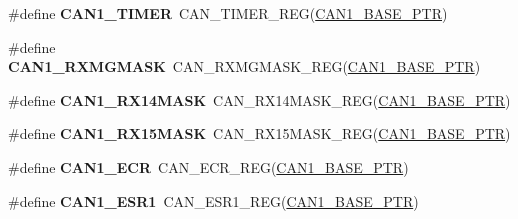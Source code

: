 \begin{DoxyCompactItemize}
\item 
\hypertarget{group___c_a_n___register___accessor___macros_gac056e0ad934790e294031f24008d0155}{}\#define {\bfseries C\+A\+N1\+\_\+\+T\+I\+M\+E\+R}~C\+A\+N\+\_\+\+T\+I\+M\+E\+R\+\_\+\+R\+E\+G(\hyperlink{group___c_a_n___peripheral_ga810387eeeb9ccd0e09ae057ff6f0d2ca}{C\+A\+N1\+\_\+\+B\+A\+S\+E\+\_\+\+P\+T\+R})\label{group___c_a_n___register___accessor___macros_gac056e0ad934790e294031f24008d0155}

\item 
\hypertarget{group___c_a_n___register___accessor___macros_ga6865459aa48a146b53bcef7a31e9b5eb}{}\#define {\bfseries C\+A\+N1\+\_\+\+R\+X\+M\+G\+M\+A\+S\+K}~C\+A\+N\+\_\+\+R\+X\+M\+G\+M\+A\+S\+K\+\_\+\+R\+E\+G(\hyperlink{group___c_a_n___peripheral_ga810387eeeb9ccd0e09ae057ff6f0d2ca}{C\+A\+N1\+\_\+\+B\+A\+S\+E\+\_\+\+P\+T\+R})\label{group___c_a_n___register___accessor___macros_ga6865459aa48a146b53bcef7a31e9b5eb}

\item 
\hypertarget{group___c_a_n___register___accessor___macros_gae037f1cead043642386af72b45393671}{}\#define {\bfseries C\+A\+N1\+\_\+\+R\+X14\+M\+A\+S\+K}~C\+A\+N\+\_\+\+R\+X14\+M\+A\+S\+K\+\_\+\+R\+E\+G(\hyperlink{group___c_a_n___peripheral_ga810387eeeb9ccd0e09ae057ff6f0d2ca}{C\+A\+N1\+\_\+\+B\+A\+S\+E\+\_\+\+P\+T\+R})\label{group___c_a_n___register___accessor___macros_gae037f1cead043642386af72b45393671}

\item 
\hypertarget{group___c_a_n___register___accessor___macros_ga158097bb7c9f2bbd738630a7719f3db5}{}\#define {\bfseries C\+A\+N1\+\_\+\+R\+X15\+M\+A\+S\+K}~C\+A\+N\+\_\+\+R\+X15\+M\+A\+S\+K\+\_\+\+R\+E\+G(\hyperlink{group___c_a_n___peripheral_ga810387eeeb9ccd0e09ae057ff6f0d2ca}{C\+A\+N1\+\_\+\+B\+A\+S\+E\+\_\+\+P\+T\+R})\label{group___c_a_n___register___accessor___macros_ga158097bb7c9f2bbd738630a7719f3db5}

\item 
\hypertarget{group___c_a_n___register___accessor___macros_ga404772a9085fef902b89a7440f9abba0}{}\#define {\bfseries C\+A\+N1\+\_\+\+E\+C\+R}~C\+A\+N\+\_\+\+E\+C\+R\+\_\+\+R\+E\+G(\hyperlink{group___c_a_n___peripheral_ga810387eeeb9ccd0e09ae057ff6f0d2ca}{C\+A\+N1\+\_\+\+B\+A\+S\+E\+\_\+\+P\+T\+R})\label{group___c_a_n___register___accessor___macros_ga404772a9085fef902b89a7440f9abba0}

\item 
\hypertarget{group___c_a_n___register___accessor___macros_ga2847524ffd1783fcd47ffaf833e5ab66}{}\#define {\bfseries C\+A\+N1\+\_\+\+E\+S\+R1}~C\+A\+N\+\_\+\+E\+S\+R1\+\_\+\+R\+E\+G(\hyperlink{group___c_a_n___peripheral_ga810387eeeb9ccd0e09ae057ff6f0d2ca}{C\+A\+N1\+\_\+\+B\+A\+S\+E\+\_\+\+P\+T\+R})\label{group___c_a_n___register___accessor___macros_ga2847524ffd1783fcd47ffaf833e5ab66}


\end{DoxyCompactItemize}

